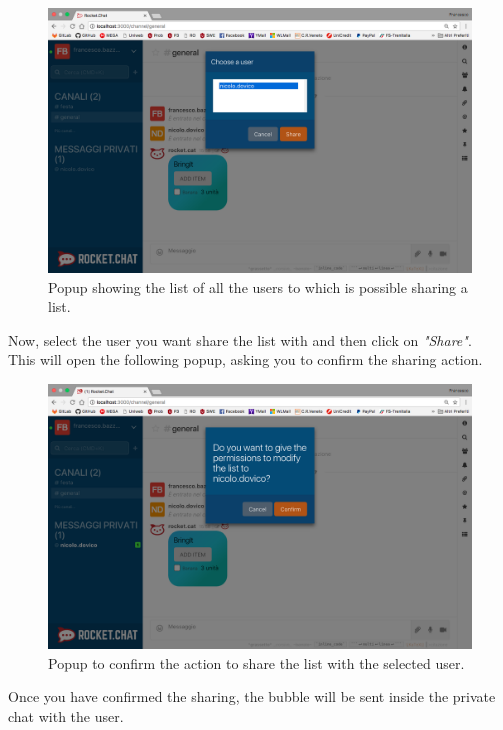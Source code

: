 \begin{figure}[H]
  \centering 
  \includegraphics[width=\textwidth]{Sections/3-HowToUse/Images/popup_share_user.png}
  \caption{Popup showing the list of all the users to which is possible sharing a list.}
\end{figure}

Now, select the user you want share the list with and then click on \textit{"Share"}. \\
This will open the following popup, asking you to confirm the sharing action.

\begin{figure}[H]
  \centering 
  \includegraphics[width=\textwidth]{Sections/3-HowToUse/Images/popup_share_user_confirm.png}
  \caption{Popup to confirm the action to share the list with the selected user.}
\end{figure}

Once you have confirmed the sharing, the bubble will be sent inside the private chat with the user.


